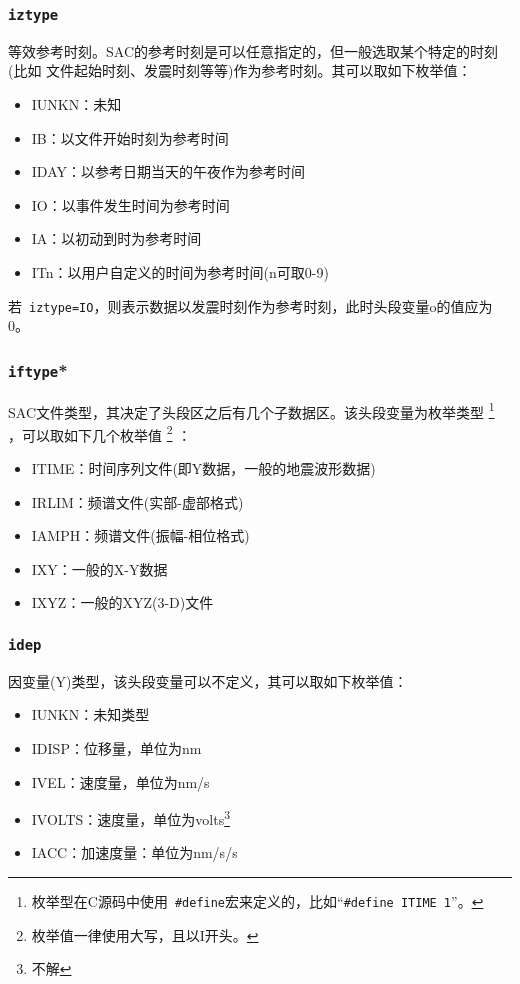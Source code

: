 \subsubsection{\texttt{iztype}}
等效参考时刻。SAC的参考时刻是可以任意指定的，但一般选取某个特定的时刻(比如
文件起始时刻、发震时刻等等)作为参考时刻。其可以取如下枚举值：
\begin{itemize}
\ttfamily
\item IUNKN：未知
\item IB：以文件开始时刻为参考时间
\item IDAY：以参考日期当天的午夜作为参考时间
\item IO：以事件发生时间为参考时间
\item IA：以初动到时为参考时间
\item ITn：以用户自定义的时间为参考时间(n可取0-9)
\end{itemize}

若~\verb+iztype=IO+，则表示数据以发震时刻作为参考时刻，此时头段变量o的值应为0。

\subsubsection{\texttt{iftype}*}
SAC文件类型，其决定了头段区之后有几个子数据区。该头段变量为枚举类型
\footnote{枚举型在C源码中使用~\verb+#define+宏来定义的，比如``\verb+#define ITIME 1+''。}
，可以取如下几个枚举值
\footnote{枚举值一律使用大写，且以I开头。} ：
\begin{itemize}
\ttfamily
\item ITIME：时间序列文件(即Y数据，一般的地震波形数据)
\item IRLIM：频谱文件(实部-虚部格式)
\item IAMPH：频谱文件(振幅-相位格式)
\item IXY：一般的X-Y数据
\item IXYZ：一般的XYZ(3-D)文件
\end{itemize}

\subsubsection{\texttt{idep}}
因变量(Y)类型，该头段变量可以不定义，其可以取如下枚举值：
\begin{itemize}
\ttfamily
\item IUNKN：未知类型
\item IDISP：位移量，单位为nm
\item IVEL：速度量，单位为nm/s
\item IVOLTS：速度量，单位为volts\footnote{不解}
\item IACC：加速度量：单位为nm/s/s
\end{itemize}

